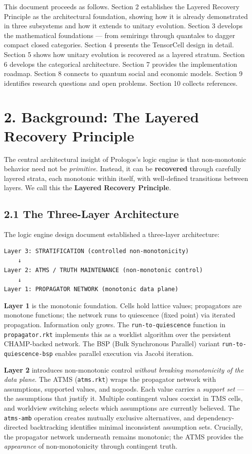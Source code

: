 \documentclass[11pt]{article}
\begin{document}
This document proceeds as follows. Section 2 establishes the Layered Recovery
Principle as the architectural foundation, showing how it is already demonstrated
in three subsystems and how it extends to unitary evolution. Section 3 develops
the mathematical foundations --- from semirings through quantales to dagger
compact closed categories. Section 4 presents the TensorCell design in detail.
Section 5 shows how unitary evolution is recovered as a layered stratum. Section 6
develops the categorical architecture. Section 7 provides the implementation
roadmap. Section 8 connects to quantum social and economic models. Section 9
identifies research questions and open problems. Section 10 collects references.
\section{2. Background: The Layered Recovery Principle}
\label{sec:orgd4d18cc}

The central architectural insight of Prologos's logic engine is that
non-monotonic behavior need not be \emph{primitive}. Instead, it can be
\textbf{recovered} through carefully layered strata, each monotonic within itself,
with well-defined transitions between layers. We call this the \textbf{Layered
Recovery Principle}.
\subsection{2.1 The Three-Layer Architecture}
\label{sec:orgb22d394}

The logic engine design document established a three-layer architecture:

\begin{verbatim}
Layer 3: STRATIFICATION (controlled non-monotonicity)
    ↓
Layer 2: ATMS / TRUTH MAINTENANCE (non-monotonic control)
    ↓
Layer 1: PROPAGATOR NETWORK (monotonic data plane)
\end{verbatim}

\textbf{Layer 1} is the monotonic foundation. Cells hold lattice values; propagators
are monotone functions; the network runs to quiescence (fixed point) via
iterated propagation. Information only grows. The \texttt{run-to-quiescence} function
in \texttt{propagator.rkt} implements this as a worklist algorithm over the persistent
CHAMP-backed network. The BSP (Bulk Synchronous Parallel) variant
\texttt{run-to-quiescence-bsp} enables parallel execution via Jacobi iteration.

\textbf{Layer 2} introduces non-monotonic control \emph{without breaking monotonicity of
the data plane}. The ATMS (\texttt{atms.rkt}) wraps the propagator network with
assumptions, supported values, and nogoods. Each value carries a \emph{support set}
--- the assumptions that justify it. Multiple contingent values coexist in TMS
cells, and worldview switching selects which assumptions are currently believed.
The \texttt{atms-amb} operation creates mutually exclusive alternatives, and
dependency-directed backtracking identifies minimal inconsistent assumption sets.
Crucially, the propagator network underneath remains monotonic; the ATMS provides
the \emph{appearance} of non-monotonicity through contingent truth.
\end{document}
